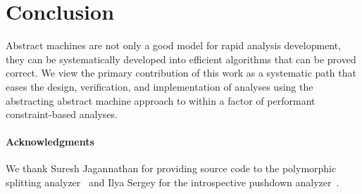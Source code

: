 \documentclass[preprint,onecolumn,9pt]{sigplanconf} %
\begin{document}
\section{Conclusion}
\label{sec:conclusion}

Abstract machines are not only a good model for rapid analysis
development, they can be systematically developed into efficient
algorithms that can be proved correct. We view the primary
contribution of this work as a systematic path that eases the design,
verification, and implementation of analyses using the abstracting
abstract machine approach to within a factor of performant
constraint-based analyses.





\paragraph{Acknowledgments}

We thank Suresh Jagannathan for providing source code to the
polymorphic splitting
analyzer~\cite{dvanhorn:wright-jagannathan-toplas98} and Ilya Sergey
for the introspective pushdown
analyzer~\cite{dvanhorn:Earl2012Introspective}.


\balance

%


% 
\end{document}

